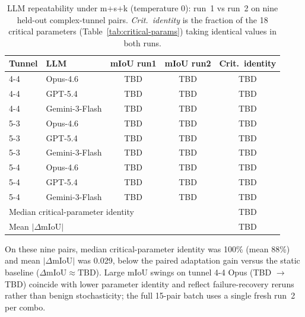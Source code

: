 \begin{table}[ht]
\caption{LLM repeatability under m+s+k (temperature 0): run~1 vs run~2 on nine held-out complex-tunnel pairs. \emph{Crit.\ identity} is the fraction of the 18 critical parameters (Table~\ref{tab:critical-params}) taking identical values in both runs.}\label{tab:repeatability}
\begin{tabular*}{\tblwidth}{@{} l l c c c @{}}
\toprule
Tunnel & LLM & mIoU run1 & mIoU run2 & Crit.\ identity \\
\midrule
4-4 & Opus-4.6 & TBD & TBD & TBD \\
4-4 & GPT-5.4 & TBD & TBD & TBD \\
4-4 & Gemini-3-Flash & TBD & TBD & TBD \\
5-3 & Opus-4.6 & TBD & TBD & TBD \\
5-3 & GPT-5.4 & TBD & TBD & TBD \\
5-3 & Gemini-3-Flash & TBD & TBD & TBD \\
5-4 & Opus-4.6 & TBD & TBD & TBD \\
5-4 & GPT-5.4 & TBD & TBD & TBD \\
5-4 & Gemini-3-Flash & TBD & TBD & TBD \\
\midrule
\multicolumn{4}{l}{Median critical-parameter identity} & TBD \\
\multicolumn{4}{l}{Mean $|\Delta\text{mIoU}|$} & TBD \\
\bottomrule
\end{tabular*}
\end{table}

\noindent On these nine pairs, median critical-parameter identity was 100\% (mean 88\%) and mean $|\Delta\text{mIoU}|$ was 0.029, below the paired adaptation gain versus the static baseline ($\Delta\text{mIoU} \approx \text{TBD}$). Large mIoU swings on tunnel 4-4 Opus (TBD $\rightarrow$ TBD) coincide with lower parameter identity and reflect failure-recovery reruns rather than benign stochasticity; the full 15-pair batch uses a single fresh run~2 per combo.

